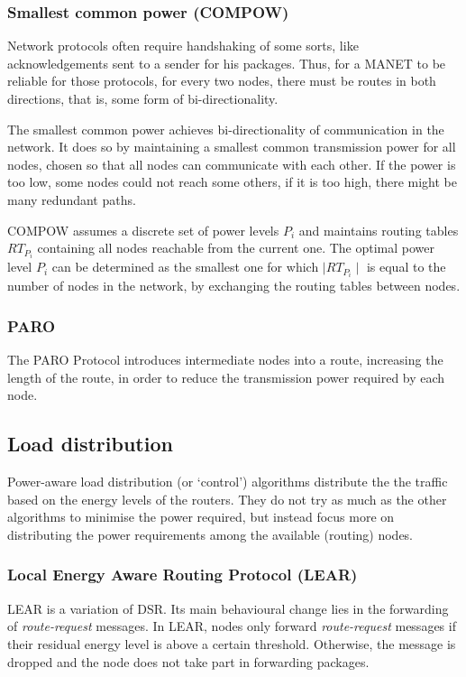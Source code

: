 \documentclass[conference]{IEEEtran}
\begin{document}
\subsubsection{Smallest common power (COMPOW)}
Network protocols often require handshaking of some sorts, like acknowledgements
sent to a sender for his packages. Thus, for a MANET to be reliable for those
protocols, for every two nodes, there must be routes in both directions, that
is, some form of bi-directionality.

The smallest common power\cite{narayanaswamy2002power} achieves bi-directionality
of communication in the network.
It does so by maintaining a smallest common transmission power for all nodes,
chosen so that all nodes can communicate with each other. If the power is too
low, some nodes could not reach some others, if it is too high, there might be
many redundant paths.

COMPOW assumes a discrete set of power levels $P_{i}$ and maintains routing
tables ${RT}_{P_{i}}$ containing all nodes reachable from the current one. The
optimal power level $P_{i}$ can be determined as the smallest one for which
$\mid RT_{P_{i}} \mid$ is equal to the number of nodes in the network, by
exchanging the routing tables between nodes.

\subsubsection{PARO}
The PARO Protocol\cite{gomez2003paro} introduces intermediate nodes into a
route, increasing the length of the route, in order to reduce the transmission
power required by each node.


\subsection{Load distribution}
Power-aware load distribution (or `control') algorithms distribute the the
traffic based on the energy levels of the routers.
They do not try as much as the other algorithms to minimise the power required,
but instead focus more on distributing the power requirements among the available (routing) nodes.

\subsubsection{Local Energy Aware Routing Protocol (LEAR)}
LEAR\cite{woo2001non} is a variation of DSR.
Its main behavioural change lies in the forwarding of \textit{route-request} messages.
In LEAR, nodes only forward \textit{route-request} messages if their residual
energy level is above a certain threshold. Otherwise, the message is dropped
and the node does not take part in forwarding packages.
\end{document}
